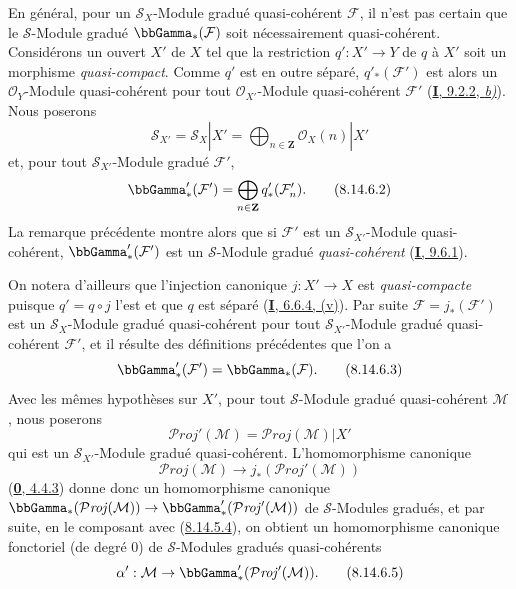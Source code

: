 \begin{env}[8.14.6]
\label{II.8.14.6-fr}
En général, pour un $\mathcal{S}_X$-Module gradué quasi-cohérent
$\mathcal{F}$, il n'est pas certain que le $\mathcal{S}$-Module gradué
$\bbGamma_*(\mathcal{F})$ soit nécessairement quasi-cohérent. Considérons un
ouvert $X'$ de $X$ tel que la restriction $q':X'\to Y$ de $q$ à $X'$ soit
un morphisme \emph{quasi-compact}. Comme $q'$ est en outre séparé,
$q'_*(\mathcal{F}')$ est alors un $\mathcal{O}_Y$-Module quasi-cohérent pour
tout $\mathcal{O}_{X'}$-Module quasi-cohérent $\mathcal{F}'$
(\hyperref[I.9.2.2-fr]{\textbf{I}, 9.2.2, \emph{b)}}). Nous poserons
\begin{equation}
\label{II.8.14.6.1-fr}
  \mathcal{S}_{X'}=\mathcal{S}_X|X'
  =\bigoplus_{n\in\mathbf{Z}}\mathcal{O}_X(n)|X'
\tag{8.14.6.1}
\end{equation}
et, pour tout $\mathcal{S}_{X'}$-Module gradué $\mathcal{F}'$,
\begin{equation}
\label{II.8.14.6.2-fr}
  \bbGamma'_*(\mathcal{F}')=
  \bigoplus_{n\in\mathbf{Z}}q'_*(\mathcal{F}'_n).
\tag{8.14.6.2}
\end{equation}
La remarque précédente montre alors que si $\mathcal{F}'$ est un
$\mathcal{S}_{X'}$-Module quasi-cohérent, $\bbGamma'_*(\mathcal{F}')$ est un
$\mathcal{S}$-Module gradué \emph{quasi-cohérent}
(\hyperref[I.9.6.1-fr]{\textbf{I}, 9.6.1}).

On notera d'ailleurs que l'injection canonique $j:X'\to X$ est
\emph{quasi-compacte} puisque $q'=q\circ j$ l'est et que $q$ est séparé
(\hyperref[I.6.6.4-fr]{\textbf{I}, 6.6.4, (v)}). Par suite
$\mathcal{F}=j_*(\mathcal{F}')$ est un $\mathcal{S}_X$-Module gradué
quasi-cohérent pour tout $\mathcal{S}_{X'}$-Module gradué quasi-cohérent
$\mathcal{F}'$, et il résulte des définitions précédentes que l'on a
\begin{equation}
\label{II.8.14.6.3-fr}
  \bbGamma'_*(\mathcal{F}')=\bbGamma_*(\mathcal{F}).
\tag{8.14.6.3}
\end{equation}
Avec les mêmes hypothèses sur $X'$, pour tout $\mathcal{S}$-Module gradué
quasi-cohérent $\mathcal{M}$, nous poserons
\begin{equation}
\label{II.8.14.6.4-fr}
  \mathcal{P}\mathit{roj}'(\mathcal{M})
  =\mathcal{P}\mathit{roj}(\mathcal{M})|X'
\tag{8.14.6.4}
\end{equation}
qui est un $\mathcal{S}_{X'}$-Module gradué quasi-cohérent. L'homomorphisme
canonique
\[
  \mathcal{P}\mathit{roj}(\mathcal{M})\to
  j_*(\mathcal{P}\mathit{roj}'(\mathcal{M}))
\]
(\hyperref[0.4.4.3-fr]{\textbf{0}, 4.4.3}) donne donc un homomorphisme canonique
$\bbGamma_*(\mathcal{P}\mathit{roj}(\mathcal{M}))\to
\bbGamma'_*(\mathcal{P}\mathit{roj}'(\mathcal{M}))$ de $\mathcal{S}$-Modules
gradués, et par suite, en le composant avec
(\hyperref[II.8.14.5.4-fr]{8.14.5.4}), on obtient un homomorphisme canonique
fonctoriel (de degré $0$) de $\mathcal{S}$-Modules gradués quasi-cohérents
\begin{equation}
\label{II.8.14.6.5-fr}
  \alpha':\mathcal{M}\to
  \bbGamma'_*(\mathcal{P}\mathit{roj}'(\mathcal{M})).
\tag{8.14.6.5}
\end{equation}
\end{env}

